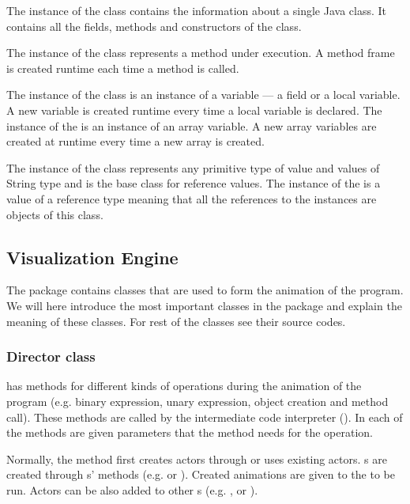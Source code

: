 The instance of the  class contains the information about a single Java class. It contains all the fields, methods and constructors of the class. 

The instance of the  class represents a method under execution. A method frame is created runtime each time a method is called.

The instance of the  class is an instance of a variable --- a field or a local variable. A new variable is created runtime every time a local variable is declared. The instance of the  is an instance of an array variable. A new array variables are created at runtime every time a new array is created.

The instance of the  class represents any primitive type of value and values of String type and is the base class for reference values. The instance of the  is a value of a reference type meaning that all the references to the instances are objects of this class. 

\subsection{Visualization Engine}
\label{sec:Visualization_Engine}

The package  contains classes that are used to form the animation of the program. We will here introduce the most important classes in the package and explain the meaning of these classes. For rest of the classes see their source codes.

\subsubsection{Director class}

 has methods for different kinds of operations during the animation of the program (e.g. binary expression, unary expression, object creation and method call). These methods are called by the intermediate code interpreter (). In each of the methods are given parameters that the method needs for the operation.

Normally, the method first creates actors through  or uses existing actors. s are created through s' methods (e.g.  or ). Created animations are given to the  to be run. Actors can be also added to other s (e.g. ,  or ).

